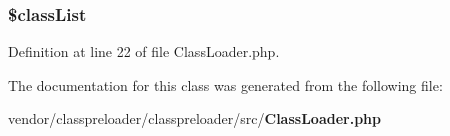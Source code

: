 \subsubsection[{\$class\+List}]{\setlength{\rightskip}{0pt plus 5cm}\$class\+List}\label{class_class_preloader_1_1_class_loader_a179c6b6e467b41293fb8fcb769c5f8a6}


Definition at line 22 of file Class\+Loader.\+php.



The documentation for this class was generated from the following file\+:\begin{DoxyCompactItemize}
\item 
vendor/classpreloader/classpreloader/src/{\bf Class\+Loader.\+php}\end{DoxyCompactItemize}
